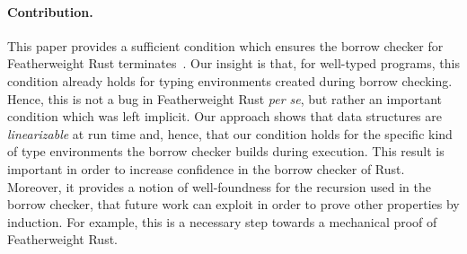 \paragraph{Contribution.}

This paper provides a sufficient condition which ensures the borrow
checker for Featherweight Rust terminates~\cite{Pea21}.  Our insight
is that, for well-typed programs, this condition already holds for
typing environments created during borrow checking.  Hence, this is
not a bug in Featherweight Rust {\em per se}, but rather an important
condition which was left implicit.  Our approach shows that data
structures are \emph{linearizable} at run time and, hence, that our
condition holds for the specific kind of type environments the borrow
checker builds during execution.  This result is important in order to
increase confidence in the borrow checker of Rust.  Moreover, it
provides a notion of well-foundness for the recursion used in the
borrow checker, that future work can exploit in order to prove other
properties by induction.  For example, this is a necessary step
towards a mechanical proof of Featherweight Rust.
